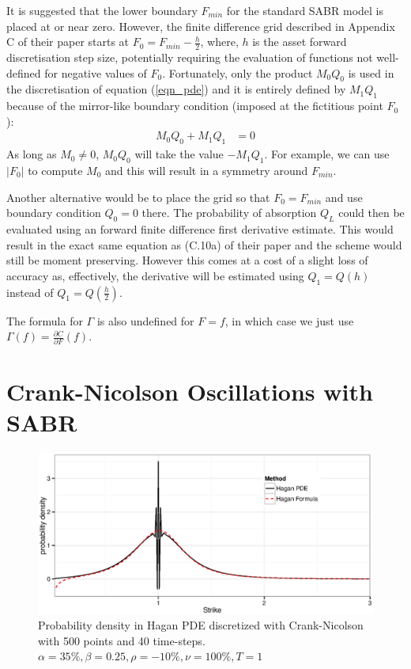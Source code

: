 \documentclass[]{rAMF2e}
\begin{document}
It is suggested that the lower boundary $F_{min}$ for the standard SABR model is placed at or near zero. However, the finite difference grid described in Appendix C of their paper starts at  $F_0 = F_{min} - \frac{h}{2}$, where, $h$ is the asset forward discretisation step size, potentially requiring the evaluation of functions not well-defined for negative values of $F_0$. Fortunately, only the product $M_0 Q_0$ is used in the discretisation of equation (\ref{eqn_pde}) and it is entirely defined by $M_1 Q_1$  because of the mirror-like boundary condition (imposed at the fictitious point $F_0$): 
\begin{align}\label{boundary_condition}
M_0 Q_0 + M_1 Q_1 &= 0
\end{align}
As long as $M_0 \neq 0$, $M_0 Q_0$ will take the value $-M_1 Q_1$. For example, we can use $|F_0|$ to compute $M_0$ and this will result in a symmetry around $F_{min}$.


Another alternative would be to place the grid so that $F_0 = F_{min}$ and use boundary condition $Q_0 = 0$ there. The probability of absorption $Q_L$ could then be evaluated using an forward finite difference first derivative estimate. This would result in the exact same equation as (C.10a) of their paper and the scheme would still be moment preserving. However this comes at a cost of a slight loss of accuracy as, effectively, the derivative will be estimated using $Q_1 = Q(h)$ instead of $Q_1 = Q(\frac{h}{2})$.

The formula for $\Gamma$ is also undefined for $F=f$, in which case we just use $\Gamma(f) = \frac{\partial C}{\partial F}(f)$.

\section{Crank-Nicolson Oscillations with SABR}\label{section_cn}
\begin{figure}[htb]
  \begin{center}  
    \includegraphics[width=12cm]{density_hagan_cn_500_40.eps}
  \end{center}
     \caption{\label{fig:density_hagan_cn_500_40} Probability density in Hagan PDE discretized with Crank-Nicolson with 500 points and 40 time-steps. $\alpha=35\%, \beta=0.25, \rho=-10\%, \nu=100\%, T=1$}
\end{figure}
\end{document}

